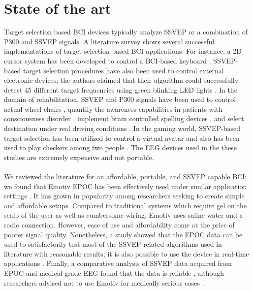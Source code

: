 \documentclass[smallextended]{svjour3}
\begin{document}
\section{State of the art}
\label{sec:soa}
Target selection based BCI devices typically analyze SSVEP or a combination of P300 and SSVEP signals. A literature survey shows several successful implementations of target selection based BCI applications. For instance, a 2D cursor system has been developed to control a BCI-based keyboard \cite{yin2015hybrid}. SSVEP-based target selection procedures have also been used to control external electronic devices; the authors claimed that their algorithm could successfully detect 45 different target frequencies using green blinking LED lights \cite{SSVEPfiability}. In the domain of rehabilitation, SSVEP and P300 signals have been used to control actual wheel-chairs \cite{paper4}, quantify the awareness capabilities in patients with consciousness disorder \cite{paper8}, implement brain controlled spelling devices \cite{paper2}, and select destination under real driving conditions \cite{car}. In the gaming world, SSVEP-based target selection has been utilized to control a virtual avatar \cite{paper_5} and also has been used to play checkers among two people \cite{paper6}. The EEG devices used in the these studies are extremely expensive and not portable.\\
\\
We reviewed the literature for an affordable, portable, and SSVEP capable BCI; we found that Emotiv EPOC has been effectively used under similar application settings \cite{jian2014improving,van2012designing}. It has grown in popularity among researchers seeking to create simple and affordable setups. Compared to traditional systems which require gel on the scalp of the user as well as cumbersome wiring, Emotiv uses saline water and a radio connection. However, ease of use and affordability come at the price of poorer signal quality.
Nonetheless, a study showed that the EPOC data can be used to satisfactorily test most of the SSVEP-related algorithms used in literature with reasonable results; it is also possible to use the device in real-time applications \cite{hvaring2014comparison}.
Finally, a comparative analysis of SSVEP data acquired from EPOC and medical grade EEG found that the data is reliable \cite{liu2012implementation}, although researchers advised not to use Emotiv for medically serious cases \cite{duvinage2013performance}.\\
\end{document}

